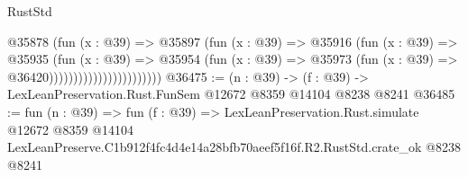 \begin{lexlean}{RustStd}
\begin{coremodule}
                                    @35878
                                      (fun (x : @39) =>
                                      @35897
                                        (fun (x : @39) =>
                                        @35916
                                          (fun (x : @39) =>
                                          @35935
                                            (fun (x : @39) =>
                                            @35954
                                              (fun (x : @39) =>
                                              @35973 (fun (x : @39) => @36420)))))))))))))))))))))))
@36475 := (n : @39) -> (f : @39) -> LexLeanPreservation.Rust.FunSem @12672 @8359 @14104 @8238 @8241
@36485 := fun (n : @39) =>
  fun (f : @39) =>
  LexLeanPreservation.Rust.simulate
    @12672
    @8359
    @14104
    LexLeanPreserve.C1b912f4fc4d4e14a28bfb70aeef5f16f.R2.RustStd.crate_ok
    @8238
    @8241
\end{coremodule}
\end{lexlean}
